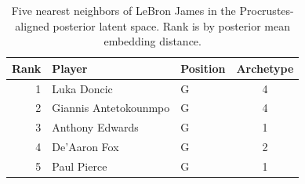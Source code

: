 \begin{table}[htbp]
  \centering\small
  \begin{tabular}{rllc}
    \toprule
    Rank & Player & Position & Archetype \\
    \midrule
    1 & Luka Doncic & G & 4 \\
    2 & Giannis Antetokounmpo & G & 4 \\
    3 & Anthony Edwards & G & 1 \\
    4 & De'Aaron Fox & G & 2 \\
    5 & Paul Pierce & G & 1 \\
    \bottomrule
  \end{tabular}
  \caption{Five nearest neighbors of LeBron James in the Procrustes-aligned posterior latent space. Rank is by posterior mean embedding distance.}
  \label{tab:LeBron_James_neighbors}
\end{table}

